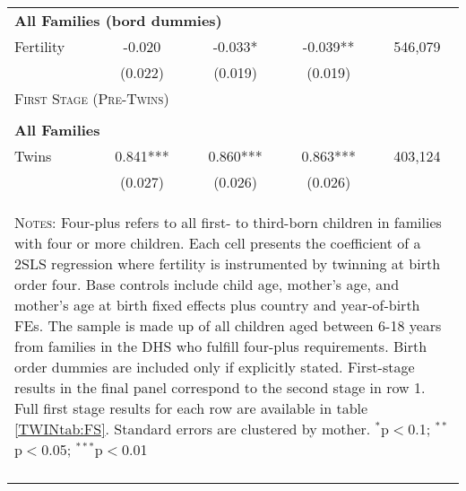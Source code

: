 \begin{table}[!htbp]
\begin{tabular}{lcccc}
\multicolumn{5}{l}{\textbf{All Families (bord dummies)}}\\ 
Fertility&-0.020&-0.033*&-0.039**&546,079\\
         &(0.022)&(0.019)&(0.019)&\\
\midrule\multicolumn{5}{l}{\textsc{First Stage (Pre-Twins)}}\\ 
&&&&\\
\multicolumn{5}{l}{\textbf{All Families}}\\ 
Twins&0.841***&0.860***&0.863***&403,124\\
         &(0.027)&(0.026)&(0.026)&\\
\hline\multicolumn{5}{p{10cm}}{\begin{footnotesize}\textsc{Notes:} Four-plus refers to all first- to third-born children in families with four or more children.  Each cell presents the coefficient of a 2SLS regression where fertility is instrumented by twinning at birth order four.  Base controls include child age, mother's age, and mother's age at birth fixed effects plus country and year-of-birth FEs.  The sample is made up of all children aged between 6-18 years from families in the DHS who fulfill four-plus requirements. Birth order dummies are included only if explicitly stated.  First-stage results in the final panel correspond to the second stage in row 1.  Full first stage results for each row are available in table \ref{TWINtab:FS}. Standard errors are clustered by mother. 
$^{*}$p$<$0.1; $^{**}$p$<$0.05; $^{***}$p$<$0.01\end{footnotesize}}
\\\bottomrule\normalsize\end{tabular}\end{table} 
